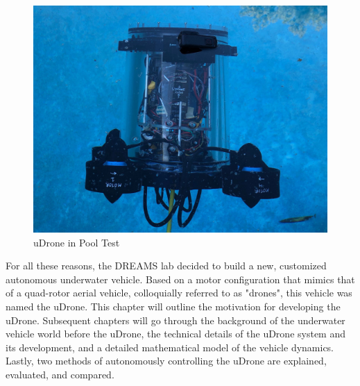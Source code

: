 \begin{figure}[ht]
\includegraphics[width=\maxwidth{\textwidth}]{img/drone_pool2.jpg}
\caption{uDrone in Pool Test}
\label{pool}
\end{figure}
For all these reasons, the DREAMS lab decided to build a new, customized autonomous underwater vehicle. Based on a motor configuration that mimics that of a quad-rotor aerial vehicle, colloquially referred to as "drones", this vehicle was named the uDrone. This chapter will outline the motivation for developing the uDrone. Subsequent chapters will go through the background of the underwater vehicle world before the uDrone, the technical details of the uDrone system and its development, and a detailed mathematical model of the vehicle dynamics. Lastly, two methods of autonomously controlling the uDrone are explained, evaluated, and compared. 

